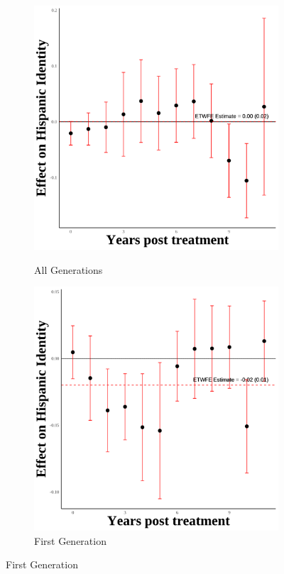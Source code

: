 \documentclass[12pt,english]{article}
\begin{document}
\begin{figure}[H]
  \caption{Immigration Enforcement and Hispanic Identity by Generation}
  \label{fig:hispanic-generations}
  \centering

  \begin{subfigure}[b]{0.30\textwidth} %
    \centering
    \caption{All Generations}
    \includegraphics[width=\linewidth]{figures/hispanic_event_study.png}
    \label{fig:hispanic-event-study-all}
  \end{subfigure}
  \hfill %
  \begin{subfigure}[b]{0.30\textwidth}
    \centering
    \caption{First Generation}
    \includegraphics[width=\linewidth]{figures/firstgen-hispanic_event_study.png}

\end{subfigure}
\end{figure}
\end{document}
